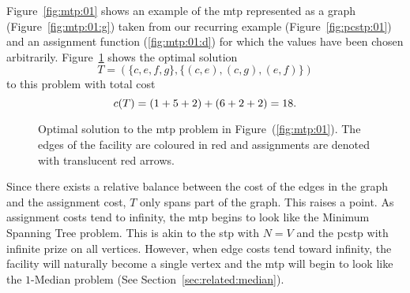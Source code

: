 Figure~\ref{fig:mtp:01} shows an example of the \gls{mtp} represented as a graph
(Figure~\ref{fig:mtp:01:g}) taken from our recurring example (Figure~\ref{fig:pcstp:01})
and an assignment function (\ref{fig:mtp:01:d}) for which the values have been
chosen arbitrarily.
Figure~\ref{fig:mtp:01:opt}
shows the optimal solution
\[T = ( \{ c, e, f, g \}, \{(c, e), (c, g), (e, f)\})\]
to this problem with total cost
\[c(T) = (1 + 5 + 2) + (6 + 2 + 2) = 18\mathnormal{.}\]
\begin{figure}[h!]
  \centering
    \caption{Optimal solution to the \gls{mtp} problem in Figure~(\ref{fig:mtp:01}).
      The edges of the facility are coloured in red and assignments are denoted with translucent red arrows.}\label{fig:mtp:01:opt}
  \end{figure}

  Since there exists a relative balance between the cost of the edges in the graph and the assignment cost, $T$
  only spans part of the graph. This raises a point. As assignment costs tend to infinity, the \gls{mtp} begins to look
  like the Minimum Spanning Tree problem.
  This is akin to the \gls{stp} with $N = V$ and the \gls{pcstp} with infinite prize
  on all vertices. However, when edge costs tend toward infinity, the facility will naturally become a single vertex
  and the \gls{mtp} will begin to look like the $1$-Median problem (See Section~\ref{sec:related:median}).

